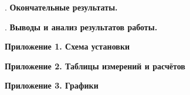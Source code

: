 \documentclass[12pt]{article}
\begin{document}
    \mediumvspace

    . \textbf{Окончательные результаты.}

    

    \mediumvspace

    . \textbf{Выводы и анализ результатов работы.}

    

    \clearpage

    \begin{center}
        \LARGE
        \textbf{Приложение 1. Схема установки}
    \end{center}

    \mediumvspace

    

    \clearpage

    \begin{center}
        \LARGE
        \textbf{Приложение 2. Таблицы измерений и расчётов}
    \end{center}

    \mediumvspace

    

    

    \clearpage

    \begin{center}
        \LARGE
        \textbf{Приложение 3. Графики}
    \end{center}

    \mediumvspace

    
\end{document}

